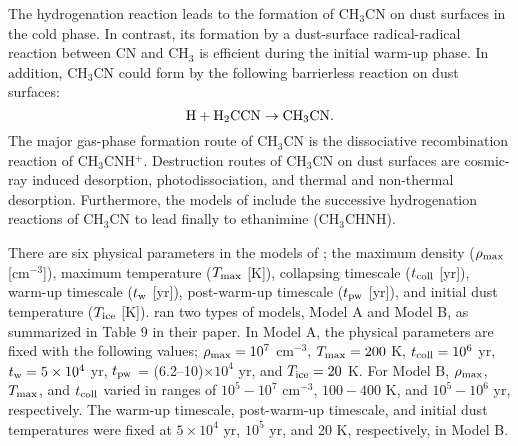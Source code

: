 \documentclass[twocolumn, twocolappendix]{aastex631}
\begin{document}
The hydrogenation reaction leads to the formation of CH$_{3}$CN on dust surfaces in the cold phase. 
In contrast, its formation by a dust-surface radical-radical reaction between CN and CH$_{3}$ is efficient during the initial warm-up phase.
In addition, CH$_{3}$CN could form by the following barrierless reaction on dust surfaces:
\begin{equation} \label{eq:CH3CN1}
{\rm {H}} + {\rm{H}}_2{\rm{CCN}} \rightarrow {\rm {CH}}_3{\rm{CN}}.
\end{equation}
The major gas-phase formation route of CH$_{3}$CN is the dissociative recombination reaction of CH$_{3}$CNH$^{+}$.
Destruction routes of CH$_{3}$CN on dust surfaces are cosmic-ray induced desorption, photodissociation, and thermal and non-thermal desorption.
Furthermore, the models of \citet{2020ApJ...895...86G} include the successive hydrogenation reactions of CH$_{3}$CN to lead finally to ethanimine (CH$_{3}$CHNH). 

There are six physical parameters in the models of \citet{2020ApJ...895...86G}; the maximum density ($\rho_{\rm {max}}$ [cm$^{-3}$]), maximum temperature ($T_{\rm {max}}$ [K]), collapsing timescale ($t_{\rm {coll}}$ [yr]), warm-up timescale ($t_{\rm {w}}$ [yr]), post-warm-up timescale ($t_{\rm {pw}}$ [yr]), and initial dust temperature ($T_{\rm {ice}}$ [K]).
\citet{2020ApJ...895...86G} ran two types of models, Model A and Model B, as summarized in Table 9 in their paper.
In Model A, the physical parameters are fixed with the following values; $\rho_{\rm {max}}=10^7$ cm$^{-3}$, $T_{\rm {max}} = 200$ K, $t_{\rm {coll}}=10^6$ yr, $t_{\rm {w}}=5\times10^4$ yr, $t_{\rm {pw}}$ = (6.2--10)$\times10^{4}$ yr, and $T_{\rm {ice}}=20$ K.
For Model B, $\rho_{\rm {max}}$, $T_{\rm {max}}$, and $t_{\rm {coll}}$ varied in ranges of $10^5-10^7$ cm$^{-3}$, $100-400$ K, and $10^5-10^6$ yr, respectively.
The warm-up timescale, post-warm-up timescale, and initial dust temperatures were fixed at $5\times10^4$ yr, $10^5$ yr, and 20 K, respectively, in Model B.
\end{document}
